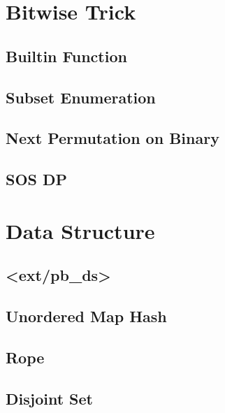 \documentclass[a4paper,10pt,twocolumn,oneside]{article}
\begin{document}
\section{Bitwise Trick}

\subsection{Builtin Function}


\subsection{Subset Enumeration}


\subsection{Next Permutation on Binary}


\subsection{SOS DP}


\section{Data Structure}

\subsection{<ext/pb\_ds>}


\subsection{Unordered Map Hash}


\subsection{Rope}


\subsection{Disjoint Set}

\end{document}
